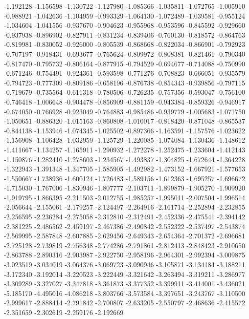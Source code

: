 -1.192128
-1.156598
-1.130722
-1.127980
-1.085366
-1.035811
-1.072765
-1.005910
-0.988921
-1.042636
-1.104959
-0.993329
-1.064130
-1.072489
-1.039581
-0.955124
-1.034604
-1.041556
-0.937670
-0.904623
-0.955968
-0.953596
-0.845592
-0.929660
-0.937938
-0.896902
-0.827911
-0.831234
-0.839406
-0.760130
-0.818572
-0.864763
-0.819981
-0.830052
-0.926000
-0.805539
-0.868668
-0.822034
-0.866901
-0.792923
-0.707197
-0.918431
-0.693677
-0.765624
-0.809972
-0.808381
-0.821461
-0.790340
-0.817470
-0.795732
-0.806164
-0.877915
-0.794529
-0.694677
-0.714088
-0.750990
-0.671246
-0.754491
-0.924361
-0.593598
-0.771276
-0.708823
-0.666051
-0.935579
-0.794723
-0.777309
-0.809186
-0.658196
-0.876738
-0.854343
-0.939856
-0.797115
-0.719679
-0.735564
-0.611318
-0.780506
-0.726235
-0.757356
-0.593047
-0.756100
-0.746418
-1.006648
-0.904478
-0.856909
-0.881159
-0.943384
-0.859326
-0.946917
-0.674050
-0.766928
-0.923049
-0.764883
-0.985486
-0.939779
-1.005683
-1.071750
-1.050651
-0.886320
-1.015163
-0.860808
-1.010017
-0.818420
-0.871048
-0.865537
-0.844138
-1.153946
-1.074345
-1.025502
-0.897366
-1.163591
-1.157576
-1.023622
-1.156908
-1.106428
-1.032959
-1.125729
-1.220085
-1.074084
-1.130436
-1.148612
-1.411667
-1.134257
-1.165911
-1.290932
-1.272278
-1.252475
-1.233604
-1.412143
-1.150876
-1.282410
-1.278603
-1.234567
-1.493837
-1.304825
-1.672644
-1.364228
-1.322943
-1.391348
-1.347705
-1.585905
-1.492982
-1.473152
-1.667921
-1.577653
-1.550667
-1.738936
-1.600124
-1.726483
-1.589156
-1.612363
-1.695257
-1.696672
-1.715030
-1.767006
-1.830946
-1.807777
-2.103711
-1.899879
-1.905270
-1.909920
-1.919795
-1.866395
-2.211503
-2.012755
-1.985257
-1.995011
-2.007504
-1.996514
-2.056644
-2.155061
-2.179257
-2.124497
-2.264916
-2.161714
-2.252894
-2.232855
-2.256595
-2.236284
-2.275058
-2.312810
-2.312491
-2.452336
-2.475541
-2.394142
-2.381225
-2.486562
-2.459197
-2.467386
-2.490842
-2.552322
-2.537497
-2.543874
-2.569995
-2.587848
-2.607885
-2.629456
-2.649343
-2.654364
-2.701372
-2.696681
-2.725128
-2.739819
-2.756348
-2.774286
-2.791861
-2.812413
-2.848423
-2.910650
-2.863788
-2.890316
-2.903987
-2.922750
-2.958196
-2.964301
-2.992394
-3.009875
-3.023519
-3.034019
-3.064376
-3.069723
-3.090946
-3.105871
-3.134184
-3.188211
-3.172340
-3.192014
-3.220523
-3.222449
-3.321642
-3.263494
-3.319211
-3.286977
-3.309289
-3.327027
-3.347818
-3.361873
-3.377352
-3.399911
-3.414001
-3.436021
-5.185170
-4.495016
-4.086218
-3.803766
-3.573584
-3.397651
-3.243767
-3.110500
-2.999617
-2.888414
-2.791842
-2.700807
-2.633205
-2.550797
-2.468636
-2.415572
-2.351659
-2.302619
-2.259176
-2.192669
